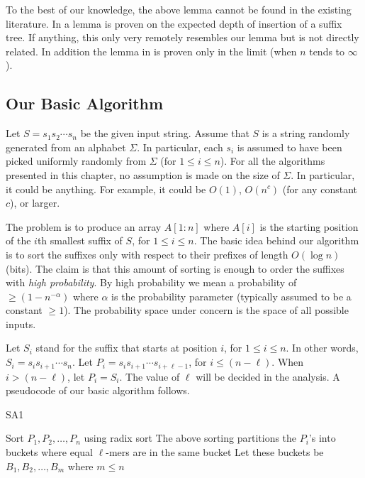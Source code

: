  To the best of our knowledge, the above lemma cannot be
found in the existing literature. In \cite{Szp01} a lemma is proven on the
expected depth of insertion of a suffix tree. If anything, this only very
remotely resembles our lemma but is not directly related. In addition the lemma
in \cite{Szp01} is proven only in the limit (when $n$ tends to $\infty$).

\subsection{Our Basic Algorithm}
 Let $S=s_1s_2\cdots s_n$ be the given input string. Assume that $S$ is a
string randomly generated from an alphabet $\Sigma$. In particular, each $s_i$
is assumed to have been picked uniformly randomly from $\Sigma$ (for $1\leq
i\leq n$). For all the algorithms presented in this chapter, no assumption is
made on the size of $\Sigma$. In particular, it could be anything. For example,
it could be $O(1)$, $O(n^c)$ (for any constant $c$), or larger.

The problem is to produce an array $A[1:n]$ where $A[i]$ is the starting
position of the $i$th smallest suffix of $S$, for $1\leq i\leq n$. The basic
idea behind our algorithm is to sort the suffixes only with respect to their
prefixes of length $O(\log n)$ (bits). The claim is that this amount of sorting is
enough to order the suffixes with {\em high probability}. By high probability
we mean a probability of $\geq (1-n^{-\alpha})$ where $\alpha$ is the
probability parameter (typically assumed to be a constant $\geq 1$). The
probability space under concern is the space of all possible inputs.

Let $S_i$ stand for the suffix that starts at position $i$, for $1\leq i\leq
n$. In other words, $S_i=s_is_{i+1}\cdots s_n$. Let $P_i=s_is_{i+1}\cdots
s_{i+\ell-1}$, for $i\leq (n-\ell)$. When $i>(n-\ell)$, let $P_i=S_i$. The
value of $\ell$ will be decided in the analysis. A pseudocode of our basic
algorithm follows.


\begin{algorithm}[H]
\caption{SA1} 
Sort $P_1,P_2,\ldots,P_n$ using radix sort\;
The above sorting partitions the $P_i$'s into buckets where equal
$\ell$-mers are in the same bucket\;
Let these buckets be $B_1,B_2,\ldots,B_m$ where $m\leq n$\;
\end{algorithm}


